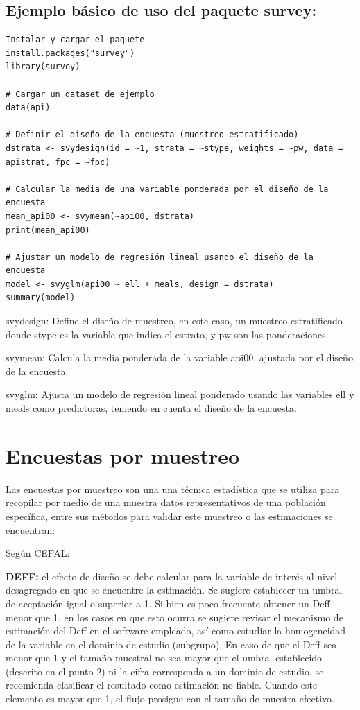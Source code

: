 \documentclass[12pt,spanish]{article}
\begin{document}
\subsection{Ejemplo básico de uso del paquete survey:}

\begin{verbatim}
Instalar y cargar el paquete
install.packages("survey")
library(survey)

# Cargar un dataset de ejemplo
data(api)

# Definir el diseño de la encuesta (muestreo estratificado)
dstrata <- svydesign(id = ~1, strata = ~stype, weights = ~pw, data = apistrat, fpc = ~fpc)

# Calcular la media de una variable ponderada por el diseño de la encuesta
mean_api00 <- svymean(~api00, dstrata)
print(mean_api00)

# Ajustar un modelo de regresión lineal usando el diseño de la encuesta
model <- svyglm(api00 ~ ell + meals, design = dstrata)
summary(model)

\end{verbatim}

svydesign: Define el diseño de muestreo, en este caso, un muestreo estratificado donde stype es la variable que indica el estrato, y pw son las ponderaciones.

svymean: Calcula la media ponderada de la variable api00, ajustada por el diseño de la encuesta.

svyglm: Ajusta un modelo de regresión lineal ponderado usando las variables ell y meals como predictoras, teniendo en cuenta el diseño de la encuesta.
\newpage
\section*{Encuestas por muestreo}

Las encuestas por muestreo son una una técnica estadística que se utiliza para recopilar por medio de una muestra datos representativos de una población específica, entre sus métodos para validar este muestreo o las estimaciones se encuentran: 

Según CEPAL:

\textbf{DEFF:} el efecto de diseño se debe calcular para la variable de interés al nivel desagregado en que se encuentre la estimación. Se sugiere establecer un umbral de aceptación igual o superior a 1. Si bien es poco frecuente obtener un Deff menor que 1, en los casos en
que esto ocurra se sugiere revisar el mecanismo de estimación del Deff en el software empleado, así como estudiar la homogeneidad de la variable en el dominio de estudio (subgrupo). En caso de que el Deff sea menor que 1 y el tamaño muestral no sea mayor que el umbral establecido (descrito en el punto 2) ni la cifra corresponda a un dominio de estudio, se recomienda clasificar el resultado como estimación no fiable.
Cuando este elemento es mayor que 1, el flujo prosigue con el tamaño de muestra efectivo.
\end{document}
